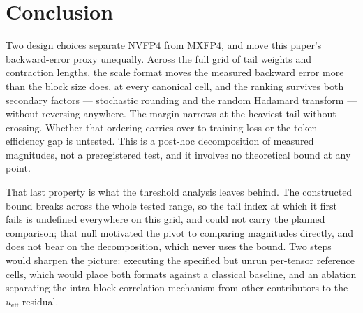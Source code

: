 \section{Conclusion}
\label{sec:conclusion}

Two design choices separate NVFP4 from MXFP4, and move this paper's
backward-error proxy unequally. Across the full grid of tail weights
and contraction lengths, the scale format moves the measured backward error more
than the block size does, at every canonical cell, and the ranking survives both
secondary factors --- stochastic rounding and the random Hadamard transform ---
without reversing anywhere. The margin narrows at the heaviest tail without
crossing. Whether that ordering carries over to training loss or the
token-efficiency gap is untested. This is a post-hoc
decomposition of measured magnitudes, not a preregistered test, and it involves
no theoretical bound at any point.

That last property is what the threshold analysis leaves behind. The constructed
bound breaks across the whole tested range, so the tail index at which it first
fails is undefined everywhere on this grid, and could not carry the planned
comparison; that null motivated the pivot to comparing magnitudes directly, and
does not bear on the decomposition, which never uses the bound. Two steps would
sharpen the picture: executing the specified but unrun per-tensor reference
cells, which would place both formats against a classical baseline, and an
ablation separating the intra-block correlation mechanism from other contributors
to the $u_{\mathrm{eff}}$ residual.
